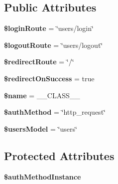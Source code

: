 \subsection*{Public Attributes}
\begin{DoxyCompactItemize}
\item 
\hypertarget{class_auth_a99bf942db5a74e07f6882b2b77cd5adb}{
{\bfseries \$loginRoute} = \char`\"{}users/login\char`\"{}}
\label{class_auth_a99bf942db5a74e07f6882b2b77cd5adb}

\item 
\hypertarget{class_auth_a8e8b5d18de722669c16b1e662d317702}{
{\bfseries \$logoutRoute} = \char`\"{}users/logout\char`\"{}}
\label{class_auth_a8e8b5d18de722669c16b1e662d317702}

\item 
\hypertarget{class_auth_acad7ed077e13396905f76bb576cd5f3b}{
{\bfseries \$redirectRoute} = \char`\"{}/\char`\"{}}
\label{class_auth_acad7ed077e13396905f76bb576cd5f3b}

\item 
\hypertarget{class_auth_ad3840b55a7e4611c352ab70cdc1aa1e1}{
{\bfseries \$redirectOnSuccess} = true}
\label{class_auth_ad3840b55a7e4611c352ab70cdc1aa1e1}

\item 
\hypertarget{class_auth_aec74f32d9f1edd3979b04069147aa4d5}{
{\bfseries \$name} = \_\-\_\-CLASS\_\-\_\-}
\label{class_auth_aec74f32d9f1edd3979b04069147aa4d5}

\item 
\hypertarget{class_auth_a88521d1a900e5eba8468e384a880275c}{
{\bfseries \$authMethod} = \char`\"{}http\_\-request\char`\"{}}
\label{class_auth_a88521d1a900e5eba8468e384a880275c}

\item 
\hypertarget{class_auth_abccf9de11fc013d25e15ca36c3c4d226}{
{\bfseries \$usersModel} = \char`\"{}users\char`\"{}}
\label{class_auth_abccf9de11fc013d25e15ca36c3c4d226}

\end{DoxyCompactItemize}
\subsection*{Protected Attributes}
\begin{DoxyCompactItemize}
\item 
\hypertarget{class_auth_a93c57206ee80d8fe02db73aacc6da6dd}{
{\bfseries \$authMethodInstance}}
\label{class_auth_a93c57206ee80d8fe02db73aacc6da6dd}

\end{DoxyCompactItemize}


